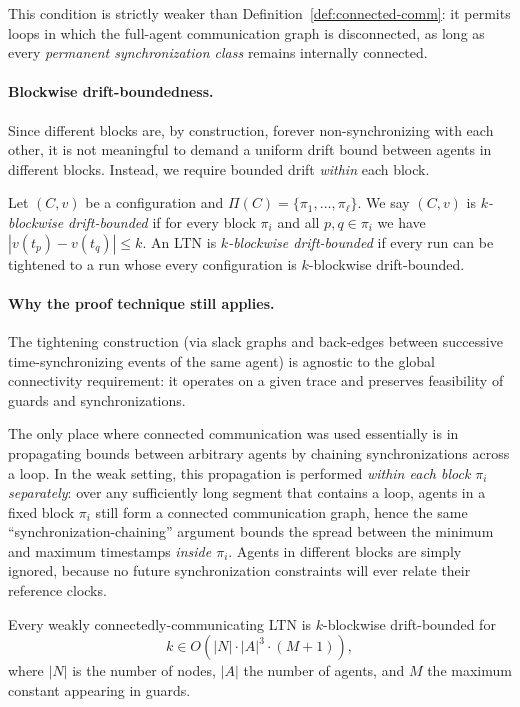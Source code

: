 This condition is strictly weaker than Definition~\ref{def:connected-comm}:
it permits loops in which the full-agent communication graph is disconnected,
as long as every \emph{permanent synchronization class} remains internally connected.

\paragraph{Blockwise drift-boundedness.}
Since different blocks are, by construction, forever non-synchronizing with each other,
it is not meaningful to demand a uniform drift bound between agents in different blocks.
Instead, we require bounded drift \emph{within} each block.

\begin{definition}
\label{def:blockwise-drift}
Let $(C,v)$ be a configuration and $\Pi(C)=\{\pi_1,\dots,\pi_\ell\}$.
We say $(C,v)$ is \emph{$k$-blockwise drift-bounded} if for every block $\pi_i$
and all $p,q\in \pi_i$ we have $|v(t_p)-v(t_q)|\le k$.
An LTN is \emph{$k$-blockwise drift-bounded} if every run can be tightened
to a run whose every configuration is $k$-blockwise drift-bounded.
\end{definition}

\paragraph{Why the proof technique still applies.}
The tightening construction (via slack graphs and back-edges between successive time-synchronizing events of the same agent) is agnostic to the global connectivity requirement: it operates on a given trace and preserves feasibility of guards and synchronizations.

The only place where connected communication was used essentially is in propagating bounds between arbitrary agents by chaining synchronizations across a loop.
In the weak setting, this propagation is performed \emph{within each block $\pi_i$ separately}:
over any sufficiently long segment that contains a loop, agents in a fixed block $\pi_i$
still form a connected communication graph, hence the same ``synchronization-chaining''
argument bounds the spread between the minimum and maximum timestamps \emph{inside $\pi_i$}.
Agents in different blocks are simply ignored, because no future synchronization constraints will ever relate their reference clocks.

\begin{theorem}
\label{thm:weak-cc-blockwise}
Every weakly connectedly-communicating LTN is $k$-blockwise drift-bounded for
\[
k \in O\!\left(|N|\cdot |A|^3 \cdot (M+1)\right),
\]
where $|N|$ is the number of nodes, $|A|$ the number of agents, and $M$ the maximum constant appearing in guards.
\end{theorem}

